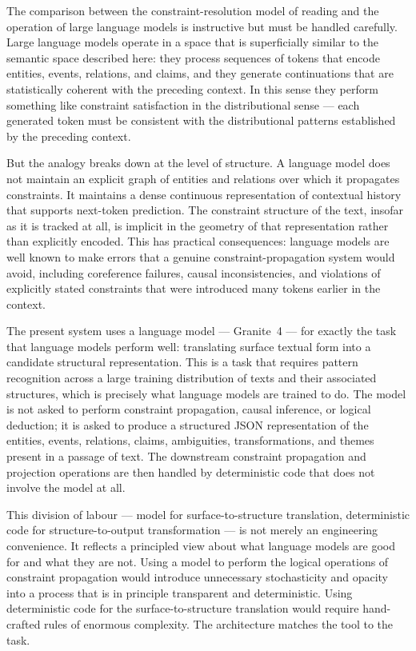 \documentclass[12pt, a4paper]{article}
\begin{document}
The comparison between the constraint-resolution model of reading and the operation of large language models is instructive but must be handled carefully. Large language models operate in a space that is superficially similar to the semantic space described here: they process sequences of tokens that encode entities, events, relations, and claims, and they generate continuations that are statistically coherent with the preceding context. In this sense they perform something like constraint satisfaction in the distributional sense — each generated token must be consistent with the distributional patterns established by the preceding context.

But the analogy breaks down at the level of structure. A language model does not maintain an explicit graph of entities and relations over which it propagates constraints. It maintains a dense continuous representation of contextual history that supports next-token prediction. The constraint structure of the text, insofar as it is tracked at all, is implicit in the geometry of that representation rather than explicitly encoded. This has practical consequences: language models are well known to make errors that a genuine constraint-propagation system would avoid, including coreference failures, causal inconsistencies, and violations of explicitly stated constraints that were introduced many tokens earlier in the context.

The present system uses a language model — Granite~4 — for exactly the task that language models perform well: translating surface textual form into a candidate structural representation. This is a task that requires pattern recognition across a large training distribution of texts and their associated structures, which is precisely what language models are trained to do. The model is not asked to perform constraint propagation, causal inference, or logical deduction; it is asked to produce a structured JSON representation of the entities, events, relations, claims, ambiguities, transformations, and themes present in a passage of text. The downstream constraint propagation and projection operations are then handled by deterministic code that does not involve the model at all.

This division of labour — model for surface-to-structure translation, deterministic code for structure-to-output transformation — is not merely an engineering convenience. It reflects a principled view about what language models are good for and what they are not. Using a model to perform the logical operations of constraint propagation would introduce unnecessary stochasticity and opacity into a process that is in principle transparent and deterministic. Using deterministic code for the surface-to-structure translation would require hand-crafted rules of enormous complexity. The architecture matches the tool to the task.
\end{document}
